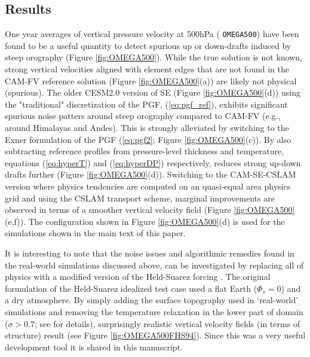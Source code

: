 \documentclass[draft]{agujournal2019}
\begin{document}
\subsection{Results}
One year averages of vertical pressure velocity at 500hPa ( {\tt OMEGA500}) have been found to be a useful quantity to detect spurious up or down-drafts induced by steep orography (Figure \ref{fig:OMEGA500}). While the true solution is not known, strong vertical velocities aligned with element edges that are not found in the CAM-FV reference solution (Figure \ref{fig:OMEGA500}(a)) are likely not physical (spurious). The older CESM2.0 version of SE (Figure \ref{fig:OMEGA500}(d)) using the "traditional" discretization of the PGF, (\ref{eq:pgf_ref}), exhibits significant spurious noise patters around steep orography compared to CAM-FV (e.g., around Himalayas and Andes). This is strongly alleviated by switching to the Exner formulation of the PGF (\ref{eq:pgf2}; Figure \ref{fig:OMEGA500}(c)). By also subtracting reference profiles from pressure-level thickness and temperature, equations (\ref{eq:hyperT}) and (\ref{eq:hyperDP}) respectively, reduces strong up-down drafts further (Figure \ref{fig:OMEGA500}(d)). Switching to the CAM-SE-CSLAM version where physics tendencies are computed on an quasi-equal area physics grid and using the CSLAM transport scheme, marginal improvements are observed in terms of a smoother vertical velocity field (Figure \ref{fig:OMEGA500}(e,f)). The configuration shown in Figure \ref{fig:OMEGA500}(d) is used for the simulations shown in the main text of this paper.

It is interesting to note that the noise issues and algorithmic remedies found in the real-world simulations discussed above, can be investigated by replacing all of physics with a modified version of the Held-Suarez forcing \cite{HS1994}. The original formulation of the Held-Suarez idealized test case used a flat Earth ($\Phi_s=0$) and a dry atmosphere. By simply adding the surface topography used in `real-world' simulations and removing the temperature relaxation in the lower part of domain ($\sigma>0.7$; see  for details), surprisingly realistic vertical velocity fields (in terms of structure) result (see Figure \ref{fig:OMEGA500FHS94}). Since this was a very useful development tool it is shared in this manuscript. 
\end{document}
